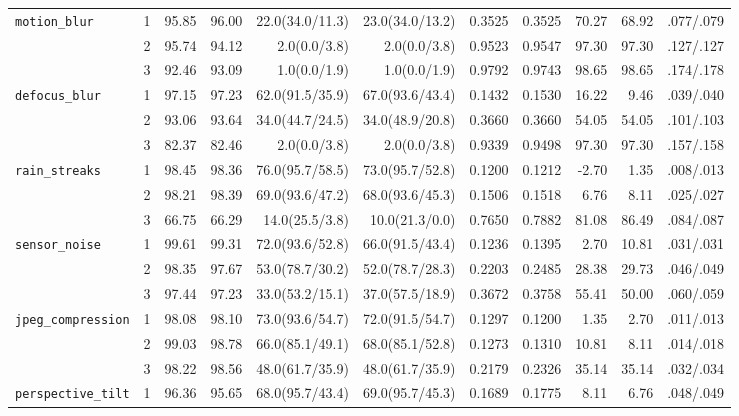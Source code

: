 \documentclass[pdflatex,sn-mathphys-num]{sn-jnl}
\begin{document}
\begin{table}[t]
{\begin{tabular}{@{}lc@{\hspace{3.5pt}}rr@{\hspace{3.5pt}}rr@{\hspace{3.5pt}}rr@{\hspace{3.5pt}}rr@{\hspace{3.5pt}}r@{}}
\midrule
\multirow{3}{*}{\texttt{motion\_blur}} & 1 & 95.85 & 96.00 & 22.0(34.0/11.3) & 23.0(34.0/13.2) & 0.3525 & 0.3525 & 70.27 & 68.92 & .077/.079 \\
 & 2 & 95.74 & 94.12 & 2.0(0.0/3.8) & 2.0(0.0/3.8) & 0.9523 & 0.9547 & 97.30 & 97.30 & .127/.127 \\
 & 3 & 92.46 & 93.09 & 1.0(0.0/1.9) & 1.0(0.0/1.9) & 0.9792 & 0.9743 & 98.65 & 98.65 & .174/.178 \\
\midrule
\multirow{3}{*}{\texttt{defocus\_blur}} & 1 & 97.15 & 97.23 & 62.0(91.5/35.9) & 67.0(93.6/43.4) & 0.1432 & 0.1530 & 16.22 & 9.46 & .039/.040 \\
 & 2 & 93.06 & 93.64 & 34.0(44.7/24.5) & 34.0(48.9/20.8) & 0.3660 & 0.3660 & 54.05 & 54.05 & .101/.103 \\
 & 3 & 82.37 & 82.46 & 2.0(0.0/3.8) & 2.0(0.0/3.8) & 0.9339 & 0.9498 & 97.30 & 97.30 & .157/.158 \\
\midrule
\multirow{3}{*}{\texttt{rain\_streaks}} & 1 & 98.45 & 98.36 & 76.0(95.7/58.5) & 73.0(95.7/52.8) & 0.1200 & 0.1212 & -2.70 & 1.35 & .008/.013 \\
 & 2 & 98.21 & 98.39 & 69.0(93.6/47.2) & 68.0(93.6/45.3) & 0.1506 & 0.1518 & 6.76 & 8.11 & .025/.027 \\
 & 3 & 66.75 & 66.29 & 14.0(25.5/3.8) & 10.0(21.3/0.0) & 0.7650 & 0.7882 & 81.08 & 86.49 & .084/.087 \\
\midrule
\multirow{3}{*}{\texttt{sensor\_noise}} & 1 & 99.61 & 99.31 & 72.0(93.6/52.8) & 66.0(91.5/43.4) & 0.1236 & 0.1395 & 2.70 & 10.81 & .031/.031 \\
 & 2 & 98.35 & 97.67 & 53.0(78.7/30.2) & 52.0(78.7/28.3) & 0.2203 & 0.2485 & 28.38 & 29.73 & .046/.049 \\
 & 3 & 97.44 & 97.23 & 33.0(53.2/15.1) & 37.0(57.5/18.9) & 0.3672 & 0.3758 & 55.41 & 50.00 & .060/.059 \\
\midrule
\multirow{3}{*}{\texttt{jpeg\_compression}} & 1 & 98.08 & 98.10 & 73.0(93.6/54.7) & 72.0(91.5/54.7) & 0.1297 & 0.1200 & 1.35 & 2.70 & .011/.013 \\
 & 2 & 99.03 & 98.78 & 66.0(85.1/49.1) & 68.0(85.1/52.8) & 0.1273 & 0.1310 & 10.81 & 8.11 & .014/.018 \\
 & 3 & 98.22 & 98.56 & 48.0(61.7/35.9) & 48.0(61.7/35.9) & 0.2179 & 0.2326 & 35.14 & 35.14 & .032/.034 \\
\midrule
\multirow{3}{*}{\texttt{perspective\_tilt}} & 1 & 96.36 & 95.65 & 68.0(95.7/43.4) & 69.0(95.7/45.3) & 0.1689 & 0.1775 & 8.11 & 6.76 & .048/.049 \\

\end{tabular}}
\end{table}
\end{document}
